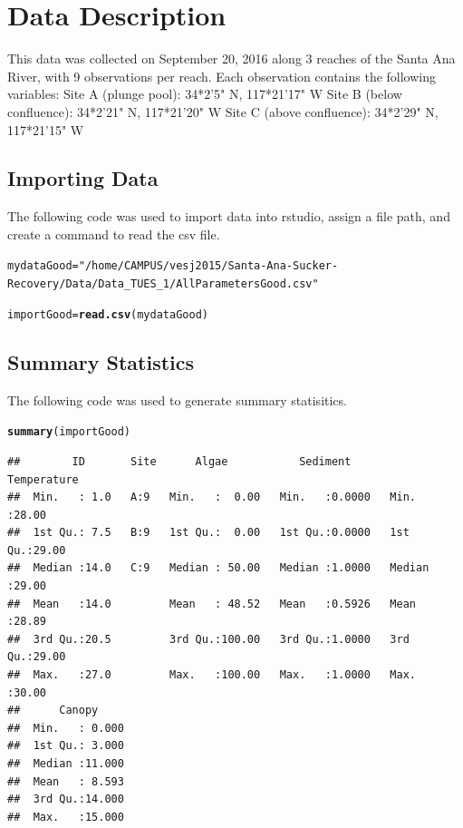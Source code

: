 \documentclass{article}\usepackage[]{graphicx}\usepackage[]{color}
\makeatletter
\newcommand{\hlstr}[1]{\textcolor[rgb]{0.192,0.494,0.8}{#1}}%
\newcommand{\hlstd}[1]{\textcolor[rgb]{0.345,0.345,0.345}{#1}}%
\newcommand{\hlkwb}[1]{\textcolor[rgb]{0.69,0.353,0.396}{#1}}%
\newcommand{\hlkwd}[1]{\textcolor[rgb]{0.737,0.353,0.396}{\textbf{#1}}}%
\newenvironment{kframe}{%
 \def\at@end@of@kframe{}%
 \ifinner\ifhmode%
  \def\at@end@of@kframe{\end{minipage}}%
  \begin{minipage}{\columnwidth}%
 \fi\fi%
 \def\FrameCommand##1{\hskip\@totalleftmargin \hskip-\fboxsep
 \colorbox{shadecolor}{##1}\hskip-\fboxsep
     \hskip-\linewidth \hskip-\@totalleftmargin \hskip\columnwidth}%
 \MakeFramed {\advance\hsize-\width
   \@totalleftmargin\z@ \linewidth\hsize
   \@setminipage}}%
 {\par\unskip\endMakeFramed%
 \at@end@of@kframe}
\newenvironment{knitrout}{}{} %
\makeatother
\begin{document}
\section{Data Description}

This data was collected on September 20, 2016 along 3 reaches of the Santa Ana River, with 9 observations per reach. Each observation contains the following variables:  
Site A (plunge pool): 34*2'5" N, 117*21'17" W
Site B (below confluence): 34*2'21" N, 117*21'20" W
Site C (above confluence): 34*2'29" N, 117*21'15" W 

\subsection{Importing Data}

The following code was used to import data into rstudio, assign a file path, and create a command to read the csv file. 
\begin{knitrout}
\color{fgcolor}\begin{kframe}
\begin{alltt}
\hlstd{mydataGood}\hlkwb{=} \hlstr{"/home/CAMPUS/vesj2015/Santa-Ana-Sucker-Recovery/Data/Data_TUES_1/AllParametersGood.csv"}

\hlstd{importGood}\hlkwb{=}\hlkwd{read.csv}\hlstd{(mydataGood)}
\end{alltt}
\end{kframe}
\end{knitrout}
\subsection{Summary Statistics}

The following code was used to generate summary statisitics. 
\begin{knitrout}
\color{fgcolor}\begin{kframe}
\begin{alltt}
\hlkwd{summary}\hlstd{(importGood)}
\end{alltt}
\begin{verbatim}
##        ID       Site      Algae           Sediment       Temperature   
##  Min.   : 1.0   A:9   Min.   :  0.00   Min.   :0.0000   Min.   :28.00  
##  1st Qu.: 7.5   B:9   1st Qu.:  0.00   1st Qu.:0.0000   1st Qu.:29.00  
##  Median :14.0   C:9   Median : 50.00   Median :1.0000   Median :29.00  
##  Mean   :14.0         Mean   : 48.52   Mean   :0.5926   Mean   :28.89  
##  3rd Qu.:20.5         3rd Qu.:100.00   3rd Qu.:1.0000   3rd Qu.:29.00  
##  Max.   :27.0         Max.   :100.00   Max.   :1.0000   Max.   :30.00  
##      Canopy      
##  Min.   : 0.000  
##  1st Qu.: 3.000  
##  Median :11.000  
##  Mean   : 8.593  
##  3rd Qu.:14.000  
##  Max.   :15.000
\end{verbatim}
\end{kframe}
\end{knitrout}
\end{document}

